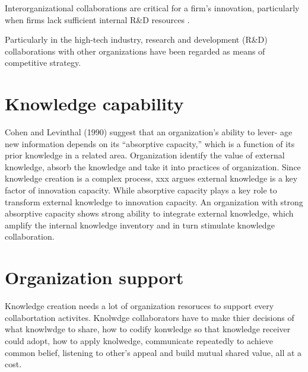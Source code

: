 \documentclass{elsarticle}
\begin{document}
Interorganizational
collaborations are critical for a firm’s innovation, particularly when firms
lack sufficient internal R\&D resources \cite{lin2003technology}.

Particularly in the high-tech
industry, research and development (R\&D) collaborations with other organizations have
been regarded as means of competitive strategy.
\section{Knowledge capability}
\label{sec:knowledge-capability}


Cohen and Levinthal
(1990) suggest that an organization’s ability to lever-
age new information depends on its “absorptive
capacity,” which is a function of its prior knowledge
in a related area. Organization identify the value of external
knowledge, absorb the knowledge and take it into practices of
organization. Since knowledge creation is a complex process, xxx
argues external knowledge is a key factor of innovation
capacity. While absorptive capacity plays a key role to transform external knowledge
to innovation capacity. An
organization with strong absorptive capacity shows strong ability to
integrate external knowledge, which amplify the internal knowledge
inventory and in turn stimulate knowledge collaboration.   

\section{Organization support}
\label{sec:organization-support}

Knowledge creation needs a lot of organization resoruces to support
every collabortation activites. Knolwdge collaborators have to make
thier decisions of 
what knowlwdge to share, how to codify konwledge so that knowledge
receiver could adopt, how to apply knolwedge, communicate repeatedly to
achieve common belief, listening to  other's appeal  and build mutual
shared value, all at a cost.   


\end{document}
